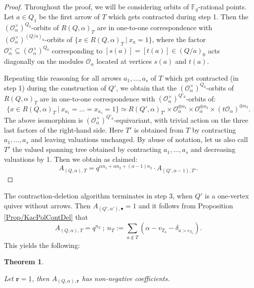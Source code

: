 \documentclass[11pt,english]{article}
\numberwithin{equation}{section}
\numberwithin{figure}{section}
\theoremstyle{definition}
\theoremstyle{plain}
\newtheorem{thm}[df]{Theorem}
\theoremstyle{remark}
\newcommand\rr{\mathbf{r}}
\newcommand\FF{\mathbb{F}}
\begin{document}
\begin{proof}

Throughout the proof, we will be considering orbits of $\FF_{q}$-rational
points. Let $a\in Q_{1}$ be the first arrow of $T$ which gets contracted
during step 1. Then the $\left(\mathcal{O}_{\alpha}^{\times}\right)^{Q_{0}}$-orbits
of $R(Q,\alpha)_{T}$ are in one-to-one correspondence with $\left(\mathcal{O}_{\alpha}^{\times}\right)^{(Q/a)_{0}}$-orbits
of $\{x\in R(Q,\alpha)_{T}\ \vert\ x_{a}=1\}$, where the factor $\mathcal{O}_{\alpha}^{\times}\subseteq\left(\mathcal{O}_{\alpha}^{\times}\right)^{Q_{0}}$
corresponding to $[s(a)]=[t(a)]\in(Q/a)_{0}$ acts diagonally on the
modules $\mathcal{O}_{\alpha}$ located at vertices $s(a)$ and $t(a)$.

Repeating this reasoning for all arrows $a_{1},\ldots,a_{s}$ of $T$
which get contracted (in step 1) during the construction of $Q'$,
we obtain that the $\left(\mathcal{O}_{\alpha}^{\times}\right)^{Q_{0}}$-orbits
of $R(Q,\alpha)_{T}$ are in one-to-one correspondence with $\left(\mathcal{O}_{\alpha}^{\times}\right)^{Q'_{0}}$-orbits
of:\[
\{x\in R(Q,\alpha)_{T}\ \vert\ x_{a_1}=\ldots=x_{a_s}=1\}
\simeq
R(Q',\alpha)_{T'}\times\mathcal{O}_{\alpha}^{\oplus n_1}\times\mathcal{O}_{\alpha}^{\oplus n_2}\times\left(t\mathcal{O}_{\alpha}\right)^{\oplus n_3}
.
\] The above isomorphism is $\left(\mathcal{O}_{\alpha}^{\times}\right)^{Q'_{0}}$-equivariant,
with trivial action on the three last factors of the right-hand side.
Here $T'$ is obtained from $T$ by contracting $a_{1},\ldots,a_{s}$
and leaving valuations unchanged. By abuse of notation, let us also
call $T'$ the valued spanning tree obtained by contracting $a_{1},\ldots,a_{s}$
and decreasing valuations by 1. Then we obtain as claimed:\[
A_{(Q,\alpha),T}=q^{\alpha n_1 + \alpha n_2 + (\alpha-1)n_2}\cdot A_{(Q',\alpha-1),T'}.
\]\end{proof}

The contraction-deletion algorithm terminates in step 3, when $Q'$
is a one-vertex quiver without arrows. Then $A_{(Q',\alpha'),\bullet}=1$
and it follows from Proposition \ref{Prop/KacPolContDel} that\[
A_{(Q,\alpha),T}=q^{n_T}
\ ; \ 
n_T:=\sum_{a\not\in T}(\alpha-v_{T_a}-\delta_{a>e_{T_a}}).
\]This yields the following:

\begin{thm} \label{Thm/PositivityToricKacPol}

Let $\rr=\underline{1}$, then $A_{(Q,\alpha),\rr}$ has non-negative
coefficients.

\end{thm}
\end{document}

